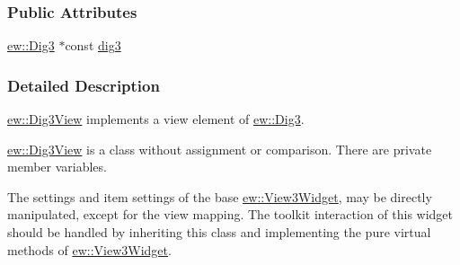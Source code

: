 \subsubsection*{Public Attributes}
\begin{DoxyCompactItemize}
\item 
\hyperlink{classew_1_1Dig3}{ew::Dig3} $\ast$const \hyperlink{classew_1_1Dig3View_af168346e6f66801de1d09ac262d55778}{dig3}
\end{DoxyCompactItemize}


\subsubsection{Detailed Description}
\hyperlink{classew_1_1Dig3View}{ew::Dig3View} implements a view element of \hyperlink{classew_1_1Dig3}{ew::Dig3}.

\hyperlink{classew_1_1Dig3View}{ew::Dig3View} is a class without assignment or comparison. There are private member variables.

The settings and item settings of the base \hyperlink{classew_1_1View3Widget}{ew::View3Widget}, may be directly manipulated, except for the view mapping. The toolkit interaction of this widget should be handled by inheriting this class and implementing the pure virtual methods of \hyperlink{classew_1_1View3Widget}{ew::View3Widget}. 

